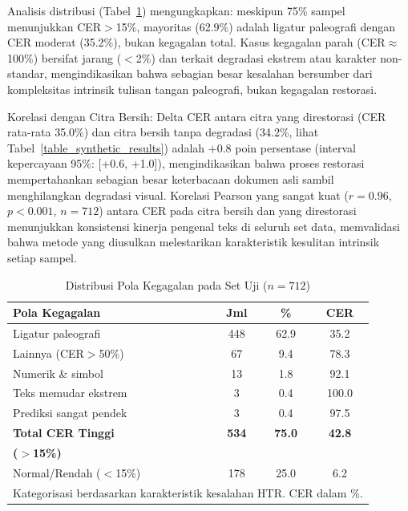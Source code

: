 \documentclass[journal]{IEEEtran}
\begin{document}
Analisis distribusi (Tabel~\ref{table_failure_distribution}) mengungkapkan: meskipun 75\% sampel menunjukkan CER$>$15\%, mayoritas (62.9\%) adalah ligatur paleografi dengan CER moderat (35.2\%), bukan kegagalan total. Kasus kegagalan parah (CER$\approx$100\%) bersifat jarang ($<$2\%) dan terkait degradasi ekstrem atau karakter non-standar, mengindikasikan bahwa sebagian besar kesalahan bersumber dari kompleksitas intrinsik tulisan tangan paleografi, bukan kegagalan restorasi.

Korelasi dengan Citra Bersih:
Delta CER antara citra yang direstorasi (CER rata-rata 35.0\%) dan citra bersih tanpa degradasi (34.2\%, lihat Tabel~\ref{table_synthetic_results}) adalah $+0.8$ poin persentase (interval kepercayaan 95\%: [+0.6, +1.0]), mengindikasikan bahwa proses restorasi mempertahankan sebagian besar keterbacaan dokumen asli sambil menghilangkan degradasi visual. Korelasi Pearson yang sangat kuat ($r = 0.96$, $p<0.001$, $n=712$) antara CER pada citra bersih dan yang direstorasi menunjukkan konsistensi kinerja pengenal teks di seluruh set data, memvalidasi bahwa metode yang diusulkan melestarikan karakteristik kesulitan intrinsik setiap sampel.

\begin{table}[!t]
\renewcommand{\arraystretch}{1.15}
\caption{Distribusi Pola Kegagalan pada Set Uji ($n=712$)}
\label{table_failure_distribution}
\centering
\footnotesize
\begin{tabularx}{\columnwidth}{|X|c|c|c|}
\hline
\textbf{Pola Kegagalan} & \textbf{Jml} & \textbf{\%} & \textbf{CER} \\
\hline
Ligatur paleografi & 448 & 62.9 & 35.2 \\
Lainnya (CER$>$50\%) & 67 & 9.4 & 78.3 \\
Numerik \& simbol & 13 & 1.8 & 92.1 \\
Teks memudar ekstrem & 3 & 0.4 & 100.0 \\
Prediksi sangat pendek & 3 & 0.4 & 97.5 \\
\hline
\textbf{Total CER Tinggi} & \textbf{534} & \textbf{75.0} & \textbf{42.8} \\
\textbf{($>$15\%)} & & & \\
Normal/Rendah ($<$15\%) & 178 & 25.0 & 6.2 \\
\hline
\multicolumn{4}{|X|}{\scriptsize Kategorisasi berdasarkan karakteristik kesalahan HTR. CER dalam \%.} \\
\hline
\end{tabularx}
\end{table}
\end{document}
